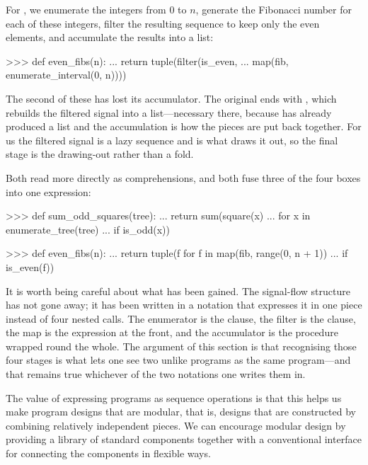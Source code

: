 \noindent
For , we enumerate the integers from 0 to \( n \), generate
the Fibonacci number for each of these integers, filter the resulting sequence
to keep only the even elements, and accumulate the results into a list:

\begin{codeBlock}
>>> def even_fibs(n):
...     return tuple(filter(is_even,
...                         map(fib, enumerate_interval(0, n))))
\end{codeBlock}

\noindent
The second of these has lost its accumulator.  The original ends with
, which rebuilds the filtered signal into a
list---necessary there, because  has already produced a list and
the accumulation is how the pieces are put back together.  For us the filtered
signal is a lazy sequence and  is what draws it out, so the final
stage is the drawing-out rather than a fold.

\begin{revealTheSurface}
Both read more directly as comprehensions, and both fuse three of the four
boxes into one expression:

\begin{codeBlock}
>>> def sum_odd_squares(tree):
...     return sum(square(x)
...                for x in enumerate_tree(tree)
...                if is_odd(x))

>>> def even_fibs(n):
...     return tuple(f for f in map(fib, range(0, n + 1))
...                  if is_even(f))
\end{codeBlock}

\noindent
It is worth being careful about what has been gained.  The signal-flow
structure has not gone away; it has been written in a notation that expresses
it in one piece instead of four nested calls.  The enumerator is the 
clause, the filter is the  clause, the map is the expression at the
front, and the accumulator is the procedure wrapped round the whole.  The
argument of this section is that recognising those four stages is what lets one
see two unlike programs as the same program---and that remains true whichever
of the two notations one writes them in.
\end{revealTheSurface}

The value of expressing programs as sequence operations is that this helps us
make program designs that are modular, that is, designs that are constructed by
combining relatively independent pieces.  We can encourage modular design by
providing a library of standard components together with a conventional
interface for connecting the components in flexible ways.

